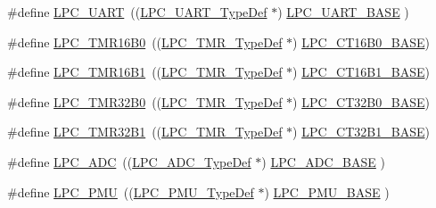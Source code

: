 \begin{DoxyCompactItemize}
\item 
\#define \hyperlink{group___l_p_c11xx___definitions_ga31a69c06776f4a82569d7ed7e91bd45c}{L\+P\+C\+\_\+\+U\+A\+RT}~((\hyperlink{struct_l_p_c___u_a_r_t___type_def}{L\+P\+C\+\_\+\+U\+A\+R\+T\+\_\+\+Type\+Def}   $\ast$) \hyperlink{group___l_p_c11xx___definitions_ga50ba023c2b0046a5be8b1b236effeb35}{L\+P\+C\+\_\+\+U\+A\+R\+T\+\_\+\+B\+A\+SE}  )
\item 
\#define \hyperlink{group___l_p_c11xx___definitions_gae3e75d39e502088028bfe901b28f6471}{L\+P\+C\+\_\+\+T\+M\+R16\+B0}~((\hyperlink{struct_l_p_c___t_m_r___type_def}{L\+P\+C\+\_\+\+T\+M\+R\+\_\+\+Type\+Def}    $\ast$) \hyperlink{group___l_p_c11xx___definitions_ga663c7a2d9c286efce1fd9c90c0068dac}{L\+P\+C\+\_\+\+C\+T16\+B0\+\_\+\+B\+A\+SE})
\item 
\#define \hyperlink{group___l_p_c11xx___definitions_gad82d36f91fa86aad5e3d57f5543e4cf6}{L\+P\+C\+\_\+\+T\+M\+R16\+B1}~((\hyperlink{struct_l_p_c___t_m_r___type_def}{L\+P\+C\+\_\+\+T\+M\+R\+\_\+\+Type\+Def}    $\ast$) \hyperlink{group___l_p_c11xx___definitions_ga5f33f849b010785defa0105cf6eb87f1}{L\+P\+C\+\_\+\+C\+T16\+B1\+\_\+\+B\+A\+SE})
\item 
\#define \hyperlink{group___l_p_c11xx___definitions_ga59694d96a23b3e6de134dc5f34ad61e8}{L\+P\+C\+\_\+\+T\+M\+R32\+B0}~((\hyperlink{struct_l_p_c___t_m_r___type_def}{L\+P\+C\+\_\+\+T\+M\+R\+\_\+\+Type\+Def}    $\ast$) \hyperlink{group___l_p_c11xx___definitions_ga10dcc3ac224bf132010cb6bc6fc7d9c9}{L\+P\+C\+\_\+\+C\+T32\+B0\+\_\+\+B\+A\+SE})
\item 
\#define \hyperlink{group___l_p_c11xx___definitions_gab5cca8bad611399aad1da65cfafcbe2e}{L\+P\+C\+\_\+\+T\+M\+R32\+B1}~((\hyperlink{struct_l_p_c___t_m_r___type_def}{L\+P\+C\+\_\+\+T\+M\+R\+\_\+\+Type\+Def}    $\ast$) \hyperlink{group___l_p_c11xx___definitions_ga70f807832b5a2afb17265d22fed6160d}{L\+P\+C\+\_\+\+C\+T32\+B1\+\_\+\+B\+A\+SE})
\item 
\#define \hyperlink{group___l_p_c11xx___definitions_gab6eaf639d3a1eec83583a9e11ab7336f}{L\+P\+C\+\_\+\+A\+DC}~((\hyperlink{struct_l_p_c___a_d_c___type_def}{L\+P\+C\+\_\+\+A\+D\+C\+\_\+\+Type\+Def}    $\ast$) \hyperlink{group___l_p_c11xx___definitions_ga2396e0d0c565e4c1c3b2fc593bd6c37f}{L\+P\+C\+\_\+\+A\+D\+C\+\_\+\+B\+A\+SE}   )
\item 
\#define \hyperlink{group___l_p_c11xx___definitions_ga9d540cc313db00679c10f9ac1961b06a}{L\+P\+C\+\_\+\+P\+MU}~((\hyperlink{struct_l_p_c___p_m_u___type_def}{L\+P\+C\+\_\+\+P\+M\+U\+\_\+\+Type\+Def}    $\ast$) \hyperlink{group___l_p_c11xx___definitions_ga865bed8ad61e9e273439ad1349a46d68}{L\+P\+C\+\_\+\+P\+M\+U\+\_\+\+B\+A\+SE}   )

\end{DoxyCompactItemize}
